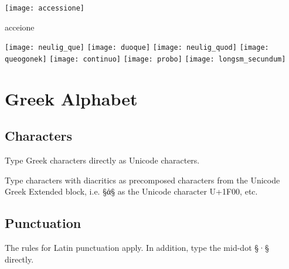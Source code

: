 \begin{example}

\texttt{[image: accessione]}

\vspace{-3mm}
\begin{typeLatin}
\bold{_}acceione\bold{_}
\end{typeLatin}

\texttt{[image: neulig\_que]} \quad
\texttt{[image: duoque]} \quad
\texttt{[image: neulig\_quod]} \quad
\texttt{[image: queogonek]} \quad
\texttt{[image: continuo]} \quad
\texttt{[image: probo]} \quad
\texttt{[image: longsm\_secundum]}

\vspace{-3mm}

\end{example}


\section{Greek Alphabet}

\tocspace
\subsection{Characters}

\begin{mainrule}
Type Greek characters directly as Unicode characters. 
\end{mainrule}

\begin{clarification}
Type characters with diacritics as precomposed characters from the Unicode Greek Extended block, i.e. §ἀ§ as the Unicode character U+1F00, etc.
\end{clarification}

\tocspace
\subsection{Punctuation}
\label{section greek punctuation}

\begin{mainrule}
The rules for Latin punctuation apply. In addition, type the mid-dot §·§ directly.
\end{mainrule}

